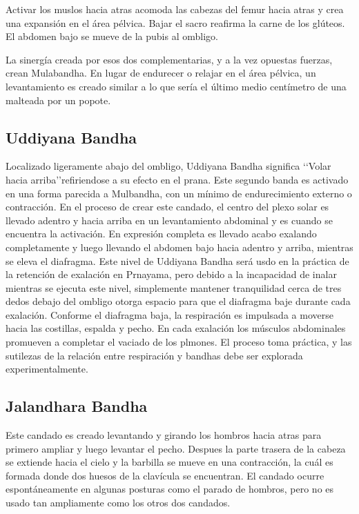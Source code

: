 Activar los muslos hacia atras acomoda las cabezas del femur hacia atras y crea una expansión en el área pélvica.
Bajar el sacro reafirma la carne de los glúteos. El abdomen bajo se mueve de la pubis al ombligo.

La sinergía creada por esos dos complementarias, y a la vez opuestas fuerzas, crean Mulabandha. En lugar de endurecer o relajar en el área pélvica, un levantamiento es creado similar a lo que sería el último medio centímetro de una malteada por un popote.

\subsection{Uddiyana Bandha}
Localizado ligeramente abajo del ombligo, Uddiyana Bandha significa \lq\lq Volar hacia arriba\rq\rq refiriendose a su efecto en el prana. Este segundo banda es activado en una forma parecida a Mulbandha, con un mínimo de endurecimiento externo o contracción. En el proceso de crear este candado, el centro del plexo solar es llevado adentro y hacia arriba en un levantamiento abdominal y es cuando se encuentra la activación. En expresión completa es llevado acabo exalando completamente y luego llevando el abdomen bajo hacia adentro y arriba, mientras se eleva el diafragma. Este nivel de Uddiyana Bandha será usdo en la práctica de la retención de exalación en Prnayama, pero debido a la incapacidad de inalar mientras se ejecuta este nivel, simplemente mantener tranquilidad cerca de tres dedos debajo del ombligo otorga espacio para que el diafragma baje durante cada exalación. Conforme el diafragma baja, la respiración es impulsada a moverse hacia las costillas, espalda y pecho. En cada exalación los músculos abdominales promueven a completar el vaciado de los plmones. El proceso toma práctica, y las sutilezas de la relación entre respiración y bandhas debe ser explorada experimentalmente.


\subsection{Jalandhara Bandha}
Este candado es creado levantando y girando los hombros  hacia atras para primero ampliar y luego levantar el pecho. Despues la parte trasera de la cabeza se extiende hacia el cielo y la barbilla se mueve en una contracción, la cuál es formada donde dos huesos de la clavícula se encuentran. El candado ocurre espontáneamente en algunas posturas como el parado de hombros, pero no es usado tan ampliamente como los otros dos candados.


